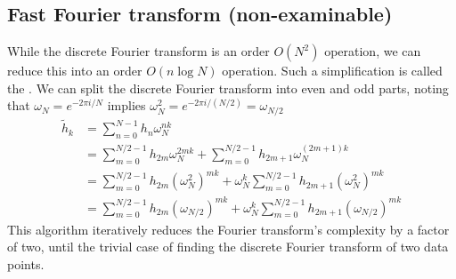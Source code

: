 \subsection{Fast Fourier transform (non-examinable)}
While the discrete Fourier transform is an order $O(N^2)$ operation, we can reduce this into an order $O(n \log N)$ operation.
Such a simplification is called the .
We can split the discrete Fourier transform into even and odd parts, noting that $\omega_N = e^{-2\pi i / N}$ implies $\omega_N^2 = e^{-2 \pi i / (N/2)} = \omega_{N/2}$
\begin{align*}
	\widetilde h_k & = \sum_{n=0}^{N-1} h_n \omega_N^{nk}                                                                           \\
    & = \sum_{m=0}^{N/2-1} h_{2m} \omega_N^{2mk} + \sum_{m=0}^{N/2-1} h_{2m + 1} \omega_N^{(2m+1)k}                  \\
    & = \sum_{m=0}^{N/2-1} h_{2m} (\omega_N^2)^{mk} + \omega_N^k \sum_{m=0}^{N/2-1} h_{2m + 1} (\omega_N^2)^{mk}     \\
    & = \sum_{m=0}^{N/2-1} h_{2m} (\omega_{N/2})^{mk} + \omega_N^k \sum_{m=0}^{N/2-1} h_{2m + 1} (\omega_{N/2})^{mk}
\end{align*}
This algorithm iteratively reduces the Fourier transform's complexity by a factor of two, until the trivial case of finding the discrete Fourier transform of two data points.